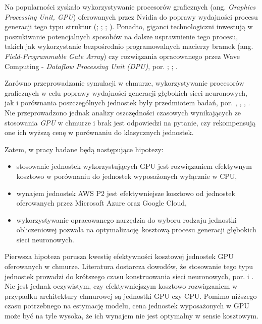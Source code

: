 \documentclass[12pt,a4paper,twoside]{article}
\begin{document}
Na popularności zyskało wykorzystywanie procesorów graficznych (ang. \textit{Graphics Processing Unit, GPU}) oferowanych przez Nvidia do poprawy wydajności procesu generacji tego typu struktur (\citet{jermain2015}; \citet{litvinenko2014}; \citet{strom2015}; \citet{vanhoucke2011}). Ponadto, giganci technologiczni inwestują w poszukiwanie potencjalnych sposobów na dalsze usprawnienie tego procesu, takich jak wykorzystanie bezpośrednio programowalnych macierzy bramek (ang. \textit{Field-Programmable Gate Array}) czy rozwiązania opracowanego przez Wave Computing - \textit{Dataflow Processing Unit (DPU)}, por. \citet{gysel2016}; \citet{chen2016}; \citet{han2016}.

Zarówno przeprowadzanie symulacji w chmurze, wykorzystywanie procesorów graficznych w celu poprawy wydajności generacji głębokich sieci neuronowych, jak i porównania poszczególnych jednostek były przedmiotem badań, por. \citet{calheiros2010}, \citet{github2017}, \citet{medium2017b}, \citet{hackernoon2017}. Nie przeprowadzono jednak analizy oszczędności czasowych wynikających ze stosowania \textit{GPU} w chmurze i brak jest odpowiedzi na pytanie, czy rekompensują one ich wyższą cenę w porównaniu do klasycznych jednostek.

Zatem, w pracy badane będą następujące hipotezy:
\begin{itemize}
\item stosowanie jednostek wykorzystujących GPU jest rozwiązaniem efektywnym kosztowo  w porównaniu do jednostek wyposażonych wyłącznie w CPU,
\item wynajem jednostek AWS P2 jest efektywniejsze kosztowo od jednostek oferowanych przez Microsoft Azure oraz Google Cloud,
\item wykorzystywanie opracowanego narzędzia do wyboru rodzaju jednostki obliczeniowej pozwala na optymalizację kosztową procesu generacji głębokich sieci neuronowych.
\end{itemize}

Pierwsza hipoteza porusza kwestię efektywności kosztowej jednostek GPU oferowanych w chmurze. Literatura dostarcza dowodów, że stosowanie tego typu jednostek prowadzi do
krótszego czasu konstruowania sieci neuronowych, por. \citet{jermain2015} i \citet{litvinenko2014}. Nie jest jednak oczywistym, czy efektywniejszym kosztowo rozwiązaniem w przypadku architektury chmurowej są jednostki GPU czy CPU. Pomimo niższego czasu potrzebnego na estymację modelu, cena jednostek wyposażonych w GPU może być
na tyle wysoka, że ich wynajem nie jest optymalny w sensie kosztowym.
\end{document}
